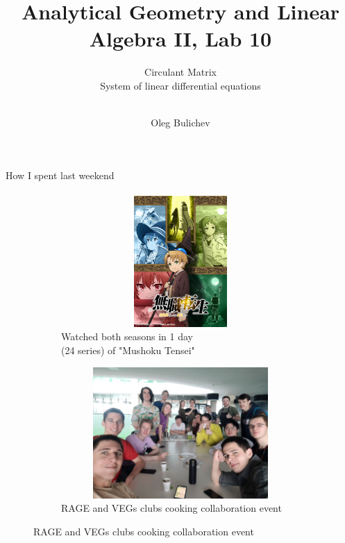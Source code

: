 \documentclass[aspectratio=169]{beamer}
\title[AGLA2]{Analytical Geometry and Linear Algebra II, Lab 10} %
\subtitle{Circulant Matrix \\ System of linear differential equations \\ \ 
         } %
\author{Oleg Bulichev}
\newcommand{\fbckg}[1]{\usebackgroundtemplate{\texttt{[image: \#1]}}}%
\begin{document}
\setlength{\abovedisplayskip}{0pt}
\setlength{\belowdisplayskip}{0pt}
\setlength{\abovedisplayshortskip}{0pt}
\setlength{\belowdisplayshortskip}{0pt}

\fbckg{fibeamer/figs/title_page.png}

\fbckg{fibeamer/figs/common.png}

\begin{frame}[c]{How I spent last weekend}
    \framesubtitle{}
    \vspace{-0.3cm}
    \begin{figure}[H]
        \begin{subfigure}{0.49\textwidth}
            \centering\includegraphics[height=5cm,width=1\textwidth,keepaspectratio]{mushoku_tensei.jpg}
            \caption*{\Large Watched both seasons in 1 day \\ (24 series) of "Mushoku Tensei"}
        \end{subfigure}
        \hfill
        \begin{subfigure}{0.49\textwidth}
            \centering\includegraphics[height=5cm,width=1\textwidth,keepaspectratio]{rage_vegs.jpg}
            \caption*{\Large RAGE and VEGs clubs cooking collaboration event}
        \end{subfigure}
        
    \end{figure}
\end{frame}
\end{document}
